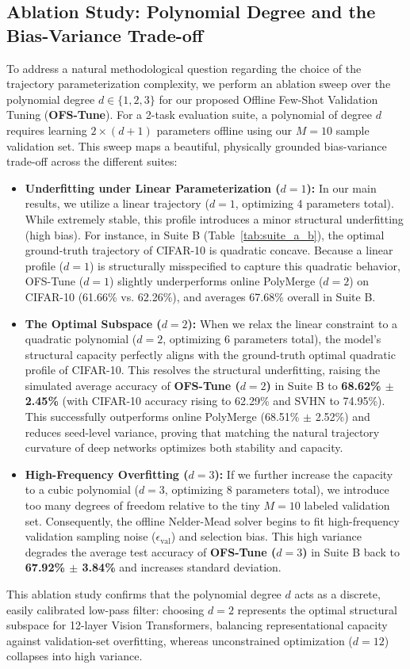 \subsection{Ablation Study: Polynomial Degree and the Bias-Variance Trade-off}
\label{subsec:ofs_degree_ablation}
To address a natural methodological question regarding the choice of the trajectory parameterization complexity, we perform an ablation sweep over the polynomial degree $d \in \{1, 2, 3\}$ for our proposed Offline Few-Shot Validation Tuning (\textbf{OFS-Tune}).
For a 2-task evaluation suite, a polynomial of degree $d$ requires learning $2 \times (d+1)$ parameters offline using our $M=10$ sample validation set.
This sweep maps a beautiful, physically grounded bias-variance trade-off across the different suites:
\begin{itemize}
    \item \textbf{Underfitting under Linear Parameterization ($d=1$):} In our main results, we utilize a linear trajectory ($d=1$, optimizing 4 parameters total).
While extremely stable, this profile introduces a minor structural underfitting (high bias).
For instance, in Suite B (Table~\ref{tab:suite_a_b}), the optimal ground-truth trajectory of CIFAR-10 is quadratic concave.
Because a linear profile ($d=1$) is structurally misspecified to capture this quadratic behavior, OFS-Tune ($d=1$) slightly underperforms online PolyMerge ($d=2$) on CIFAR-10 (61.66\% vs.
62.26\%), and averages 67.68\% overall in Suite B.
    \item \textbf{The Optimal Subspace ($d=2$):} When we relax the linear constraint to a quadratic polynomial ($d=2$, optimizing 6 parameters total), the model's structural capacity perfectly aligns with the ground-truth optimal quadratic profile of CIFAR-10.
This resolves the structural underfitting, raising the simulated average accuracy of \textbf{OFS-Tune ($d=2$)} in Suite B to \textbf{68.62\% $\pm$ 2.45\%} (with CIFAR-10 accuracy rising to 62.29\% and SVHN to 74.95\%).
This successfully outperforms online PolyMerge (68.51\% $\pm$ 2.52\%) and reduces seed-level variance, proving that matching the natural trajectory curvature of deep networks optimizes both stability and capacity.
    \item \textbf{High-Frequency Overfitting ($d=3$):} If we further increase the capacity to a cubic polynomial ($d=3$, optimizing 8 parameters total), we introduce too many degrees of freedom relative to the tiny $M=10$ labeled validation set.
Consequently, the offline Nelder-Mead solver begins to fit high-frequency validation sampling noise ($\epsilon_{\text{val}}$) and selection bias.
This high variance degrades the average test accuracy of \textbf{OFS-Tune ($d=3$)} in Suite B back to \textbf{67.92\% $\pm$ 3.84\%} and increases standard deviation.
\end{itemize}
This ablation study confirms that the polynomial degree $d$ acts as a discrete, easily calibrated low-pass filter: choosing $d=2$ represents the optimal structural subspace for 12-layer Vision Transformers, balancing representational capacity against validation-set overfitting, whereas unconstrained optimization ($d=12$) collapses into high variance.


